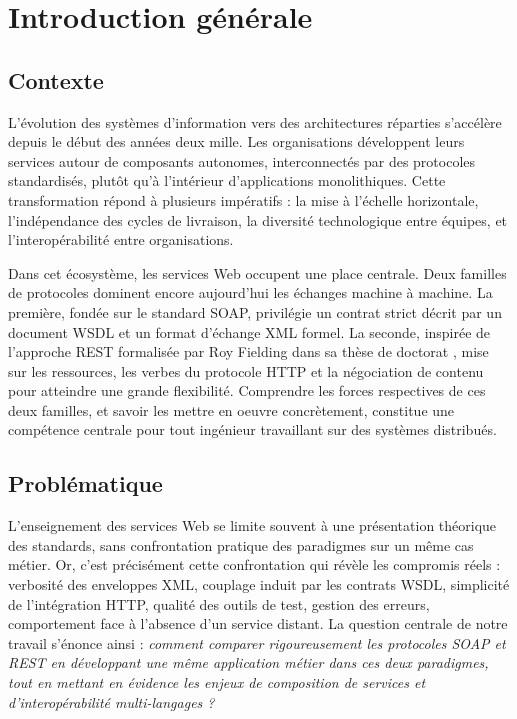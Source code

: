 \chapter*{Introduction générale}

\section*{Contexte}

L'évolution des systèmes d'information vers des architectures réparties s'accélère depuis le début des années deux mille. Les organisations développent leurs services autour de composants autonomes, interconnectés par des protocoles standardisés, plutôt qu'à l'intérieur d'applications monolithiques. Cette transformation répond à plusieurs impératifs : la mise à l'échelle horizontale, l'indépendance des cycles de livraison, la diversité technologique entre équipes, et l'interopérabilité entre organisations.

Dans cet écosystème, les services Web occupent une place centrale. Deux familles de protocoles dominent encore aujourd'hui les échanges machine à machine. La première, fondée sur le standard SOAP, privilégie un contrat strict décrit par un document WSDL et un format d'échange XML formel. La seconde, inspirée de l'approche REST formalisée par Roy Fielding dans sa thèse de doctorat \citep{fielding2000}, mise sur les ressources, les verbes du protocole HTTP et la négociation de contenu pour atteindre une grande flexibilité. Comprendre les forces respectives de ces deux familles, et savoir les mettre en oeuvre concrètement, constitue une compétence centrale pour tout ingénieur travaillant sur des systèmes distribués.

\section*{Problématique}

L'enseignement des services Web se limite souvent à une présentation théorique des standards, sans confrontation pratique des paradigmes sur un même cas métier. Or, c'est précisément cette confrontation qui révèle les compromis réels : verbosité des enveloppes XML, couplage induit par les contrats WSDL, simplicité de l'intégration HTTP, qualité des outils de test, gestion des erreurs, comportement face à l'absence d'un service distant. La question centrale de notre travail s'énonce ainsi : \emph{comment comparer rigoureusement les protocoles SOAP et REST en développant une même application métier dans ces deux paradigmes, tout en mettant en évidence les enjeux de composition de services et d'interopérabilité multi-langages ?}

